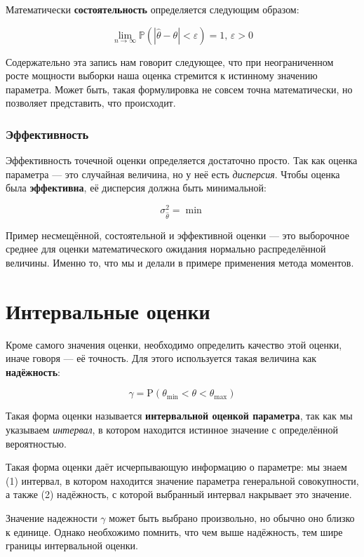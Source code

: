 \documentclass[
  letterpaper,
  DIV=11,
  numbers=noendperiod]{scrreprt}
\newcommand{\prob}{\mathbb{P}}
\theoremstyle{definition}
\theoremstyle{remark}
\begin{document}
Математически \textbf{состоятельность} определяется следующим образом:

\[
\lim_{n \rightarrow \infty} \prob (|\hat \theta - \theta| < \varepsilon) = 1, \, \varepsilon > 0
\]

Содержательно эта запись нам говорит следующее, что при неограниченном
росте мощности выборки наша оценка стремится к истинному значению
параметра. Может быть, такая формулировка не совсем точна математически,
но позволяет представить, что происходит.

\subsubsection{Эффективность}\label{ux44dux444ux444ux435ux43aux442ux438ux432ux43dux43eux441ux442ux44c}

Эффективность точечной оценки определяется достаточно просто. Так как
оценка параметра --- это случайная величина, но у неё есть
\emph{дисперсия}. Чтобы оценка была \textbf{эффективна}, её дисперсия
должна быть минимальной:

\[
\sigma^2_{\hat \theta} = \min
\]

Пример несмещённой, состоятельной и эффективной оценки --- это
выборочное среднее для оценки математического ожидания нормально
распределённой величины. Именно то, что мы и делали в примере применения
метода моментов.

\section{Интервальные
оценки}\label{ux438ux43dux442ux435ux440ux432ux430ux43bux44cux43dux44bux435-ux43eux446ux435ux43dux43aux438}

Кроме самого значения оценки, необходимо определить качество этой
оценки, иначе говоря --- её точность. Для этого используется такая
величина как \textbf{надёжность}:

\[
\gamma = \mathrm{P}(\theta_\min < \theta < \theta_\max)
\]

Такая форма оценки называется \textbf{интервальной оценкой параметра},
так как мы указываем \emph{интервал}, в котором находится истинное
значение с определённой вероятностью.

Такая форма оценки даёт исчерпывающую информацию о параметре: мы знаем
(1) интервал, в котором находится значение параметра генеральной
совокупности, а также (2) надёжность, с которой выбранный интервал
накрывает это значение.

Значение надежности \(\gamma\) может быть выбрано произвольно, но обычно
оно близко к единице. Однако необхожимо помнить, что чем выше
надёжность, тем шире границы интервальной оценки.
\end{document}
